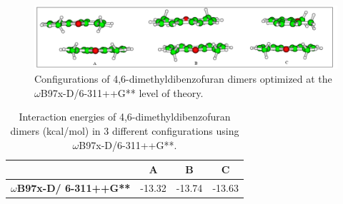 \begin{figure}[H]
	\begin{center}
		\includegraphics[scale=0.9]{image/46-dmdibf-dim}
	\end{center}
	\caption{Configurations of 4,6-dimethyldibenzofuran dimers optimized at the $\omega$B97x-D/6-311++G** level of theory.}
\end{figure}


\begin{table}[htbp]
	\caption{Interaction energies of 4,6-dimethyldibenzofuran dimers (kcal/mol) in 3 different configurations using $\omega$B97x-D/6-311++G**.}
	\begin{center}
		\begin{tabular}{cccc}
			\toprule
			& \textbf{A} & \textbf{B} & \textbf{C} \\ 
			\midrule
			\textbf{$\omega$B97x-D/
				6-311++G** }& -13.32	& -13.74	& -13.63	\\ 
			\bottomrule
		\end{tabular}
	\end{center}
	\label{}
\end{table}


